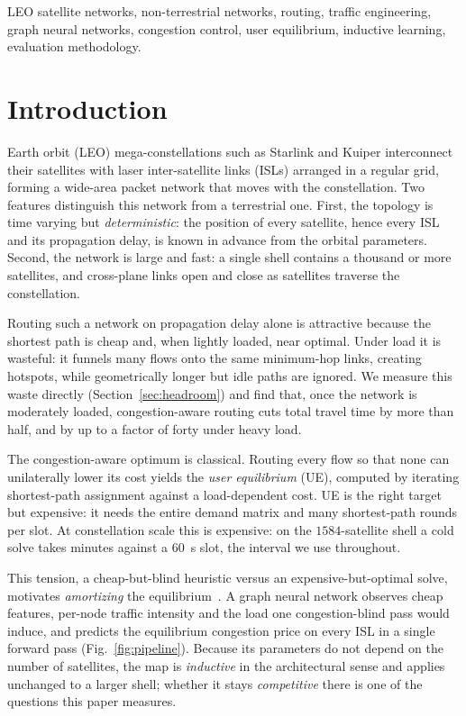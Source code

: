 \documentclass[journal]{IEEEtran}
\begin{document}
\begin{IEEEkeywords}
LEO satellite networks, non-terrestrial networks, routing, traffic engineering,
graph neural networks, congestion control, user equilibrium, inductive learning,
evaluation methodology.
\end{IEEEkeywords}

\section{Introduction}\label{sec:intro}
 Earth orbit (LEO) mega-constellations such as Starlink and
Kuiper interconnect their satellites with laser inter-satellite links (ISLs)
arranged in a regular grid, forming a wide-area packet network that moves with the
constellation. Two features distinguish this network from a terrestrial one. First,
the topology is time varying but \emph{deterministic}: the position of every
satellite, hence every ISL and its propagation delay, is known in advance from the
orbital parameters. Second, the network is large and fast: a single shell contains a
thousand or more satellites, and cross-plane links open and close as satellites
traverse the constellation.

Routing such a network on propagation delay alone is attractive because the shortest
path is cheap and, when lightly loaded, near optimal. Under load it is wasteful: it
funnels many flows onto the same minimum-hop links, creating hotspots, while
geometrically longer but idle paths are ignored. We measure this waste directly
(Section~\ref{sec:headroom}) and find that, once the network is moderately loaded,
congestion-aware routing cuts total travel time by more than half, and by up to a
factor of forty under heavy load.

The congestion-aware optimum is classical. Routing every flow so that none can
unilaterally lower its cost yields the \emph{user equilibrium} (UE), computed by
iterating shortest-path assignment against a load-dependent cost. UE is the right
target but expensive: it needs the entire demand matrix and many shortest-path rounds
per slot. At constellation scale this is expensive: on the $1584$-satellite shell a cold solve takes minutes against a $60$~s slot, the interval we use throughout.

This tension, a cheap-but-blind heuristic versus an expensive-but-optimal solve, motivates \emph{amortizing} the equilibrium~\cite{amos2023}. A graph neural network observes cheap features, per-node traffic intensity and the load one congestion-blind pass would induce, and predicts the equilibrium congestion price on every ISL in a single forward pass (Fig.~\ref{fig:pipeline}). Because its parameters do not depend on the number of satellites, the map is \emph{inductive} in the architectural sense and applies unchanged to a larger shell; whether it stays \emph{competitive} there is one of the questions this paper measures.
\end{document}
